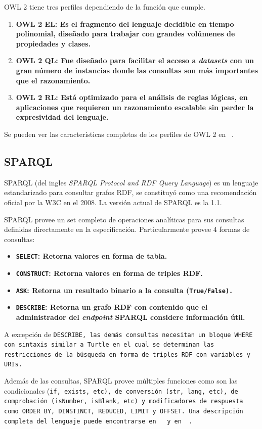 OWL 2 tiene tres perfiles dependiendo de la función que cumple.
\begin{enumerate}
  \item \bf{OWL 2 EL}: 
    Es el fragmento del lenguaje decidible en tiempo polinomial, diseñado para
    trabajar con grandes volúmenes de propiedades y clases.
  \item \bf{OWL 2 QL}:
    Fue diseñado para facilitar el acceso a \emph{datasets} con un gran número
    de instancias donde las consultas son más importantes que el razonamiento.
  \item \bf{OWL 2 RL}:
    Está optimizado para el análisis de reglas lógicas, en aplicaciones que
    requieren un razonamiento escalable sin perder la expresividad del lenguaje.
\end{enumerate}
Se pueden ver las características completas de los perfiles de OWL 2 en
~\cite{motik2009owlprofiles}.

\subsection{SPARQL}
SPARQL (del ingles \emph{SPARQL Protocol and RDF Query Language}) es un lenguaje
estandarizado para consultar grafos RDF, se constituyó como una recomendación
oficial por la W3C en el 2008\cite{bikakis2013semantic}. La versión actual de
SPARQL es la 1.1\cite{world2013sparql}.

SPARQL provee un set completo de operaciones analíticas para sus consultas
definidas directamente en la especificación. Particularmente provee 4 formas de
consultas:
\begin{itemize}
  \item \bf{\tt{SELECT}}:
    Retorna valores en forma de tabla.
  \item \bf{\tt{CONSTRUCT}}:
    Retorna valores en forma de triples RDF.
  \item \bf{\tt{ASK}}:
    Retorna un resultado binario a la consulta (\tt{True/False}).
  \item \bf{\tt{DESCRIBE}}:
    Retorna un grafo RDF con contenido que el administrador del \emph{endpoint}
    SPARQL considere información útil.
\end{itemize}
A excepción de \tt{DESCRIBE}, las demás consultas necesitan un bloque \tt{WHERE}
con sintaxis similar a Turtle en el cual se determinan las restricciones de la
búsqueda en forma de triples RDF con variables y URIs.

Además de las consultas, SPARQL provee múltiples funciones como son 
las condicionales (\tt{if}, \tt{exists}, etc), de conversión (\tt{str},
\tt{lang}, etc), de comprobación (\tt{isNumber}, \tt{isBlank}, etc) y
modificadores de respuesta como \tt{ORDER BY}, \tt{DINSTINCT}, \tt{REDUCED},
\tt{LIMIT} y \tt{OFFSET}. Una descripción completa del lenguaje puede
encontrarse en ~\cite{prud2008sparql} y en ~\cite{world2013sparql}.

